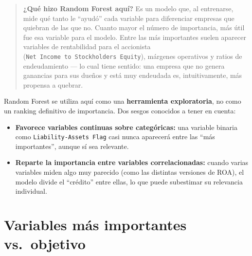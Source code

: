 \documentclass[
]{book}
\providecommand{\tightlist}{%
  \setlength{\itemsep}{0pt}\setlength{\parskip}{0pt}}
\begin{document}
\begin{quote}
\textbf{¿Qué hizo Random Forest aquí?} Es un modelo que, al entrenarse, mide qué tanto le
``ayudó'' cada variable para diferenciar empresas que quiebran de las que no. Cuanto
mayor el número de importancia, más útil fue esa variable para el modelo. Entre las
más importantes suelen aparecer variables de rentabilidad para el accionista (\texttt{Net\ Income\ to\ Stockholder\textquotesingle{}s\ Equity}), márgenes operativos y ratios de endeudamiento ---
lo cual tiene sentido: una empresa que no genera ganancias para sus dueños y está
muy endeudada es, intuitivamente, más propensa a quebrar.
\end{quote}

Random Forest se utiliza aquí como una \textbf{herramienta exploratoria}, no como un
ranking definitivo de importancia. Dos sesgos conocidos a tener en cuenta:

\begin{itemize}
\tightlist
\item
  \textbf{Favorece variables continuas sobre categóricas:} una variable binaria como
  \texttt{Liability-Assets\ Flag} casi nunca aparecerá entre las ``más importantes'', aunque sí
  sea relevante.
\item
  \textbf{Reparte la importancia entre variables correlacionadas:} cuando varias variables
  miden algo muy parecido (como las distintas versiones de ROA), el modelo divide el
  ``crédito'' entre ellas, lo que puede subestimar su relevancia individual.
\end{itemize}

\section{Variables más importantes vs.~objetivo}\label{variables-muxe1s-importantes-vs.-objetivo}
\end{document}
